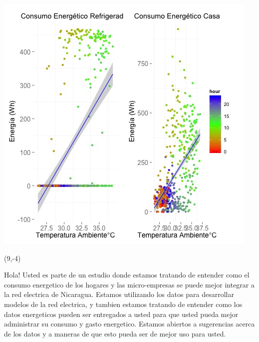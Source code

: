 \documentclass{article}\usepackage[]{graphicx}\usepackage[]{color}
\newenvironment{knitrout}{}{} %
\begin{document}
\begin{knitrout}
\color{fgcolor}
\includegraphics[scale=0.75]{figure/A10_correlaciones} 
\end{knitrout}

 \begin{textblock}{1}(9,-4)
\begin{minipage}{20em}
\begingroup

\endgroup
\end{minipage}
\end{textblock}

\vspace{70px}
\begin{knitrout}
Hola! Usted es parte de un estudio donde estamos tratando de entender como el consumo energetico de los hogares y las micro-empresas se puede mejor integrar a la red electrica de Nicaragua. Estamos utilizando los datos para desarrollar modelos de la red electrica, y tambien estamos tratando de entender como los datos energeticos pueden ser entregados a usted para que usted pueda mejor administrar su consumo y gasto energetico.  Estamos abiertos a sugerencias acerca de los datos y a maneras de que esto pueda ser de mejor uso para usted.
\end{knitrout}
\end{document}
